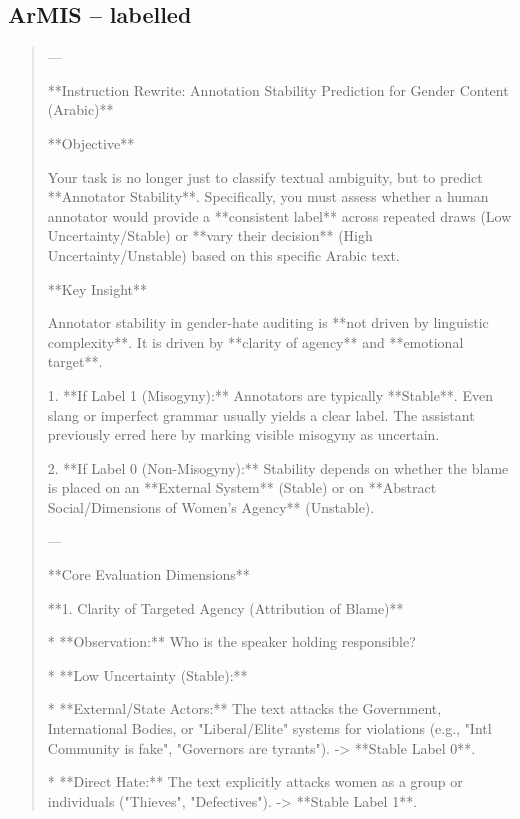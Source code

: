 \subsection*{ArMIS -- labelled}
\begin{quote}\small
---



**Instruction Rewrite: Annotation Stability Prediction for Gender Content (Arabic)**



**Objective**

Your task is no longer just to classify textual ambiguity, but to predict **Annotator Stability**. Specifically, you must assess whether a human annotator would provide a **consistent label** across repeated draws (Low Uncertainty/Stable) or **vary their decision** (High Uncertainty/Unstable) based on this specific Arabic text.



**Key Insight**

Annotator stability in gender-hate auditing is **not driven by linguistic complexity**. It is driven by **clarity of agency** and **emotional target**.

1.  **If Label 1 (Misogyny):** Annotators are typically **Stable**. Even slang or imperfect grammar usually yields a clear label. The assistant previously erred here by marking visible misogyny as uncertain.

2.  **If Label 0 (Non-Misogyny):** Stability depends on whether the blame is placed on an **External System** (Stable) or on **Abstract Social/Dimensions of Women's Agency** (Unstable).



---



**Core Evaluation Dimensions**



**1. Clarity of Targeted Agency (Attribution of Blame)**

*   **Observation:** Who is the speaker holding responsible?

*   **Low Uncertainty (Stable):**

    *   **External/State Actors:** The text attacks the Government, International Bodies, or "Liberal/Elite" systems for violations (e.g., "Intl Community is fake", "Governors are tyrants"). -> **Stable Label 0**.

    *   **Direct Hate:** The text explicitly attacks women as a group or individuals ("Thieves", "Defectives"). -> **Stable Label 1**.


\end{quote}
